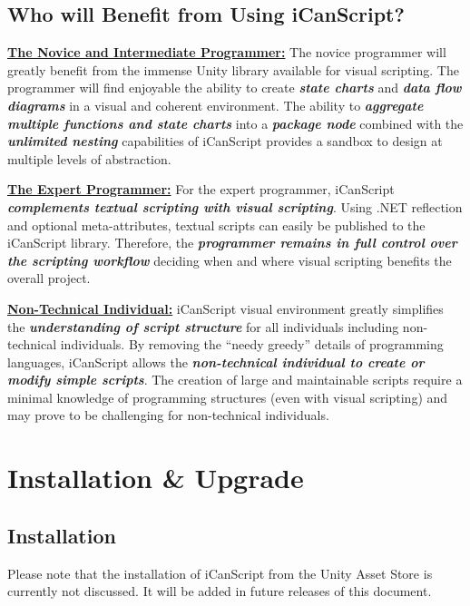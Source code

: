 \chapter{Who will Benefit from Using iCanScript?}
\label{whowillbenefitfromusingicanscript}

\underline{\textbf{The Novice and Intermediate Programmer:}} The novice programmer will greatly benefit from the immense Unity library available for visual scripting. The programmer will find enjoyable the ability to create \emph{\textbf{state charts}} and \emph{\textbf{data flow diagrams}} in a visual and coherent environment. The ability to \emph{\textbf{aggregate multiple functions and state charts}} into a \emph{\textbf{package node}} combined with the \emph{\textbf{unlimited nesting}} capabilities of iCanScript provides a sandbox to design at multiple levels of abstraction.

\underline{\textbf{The Expert Programmer:}} For the expert programmer, iCanScript \emph{\textbf{complements textual scripting with visual scripting}}. Using .NET reflection and optional meta-attributes, textual scripts can easily be published to the iCanScript library. Therefore, the \emph{\textbf{programmer remains in full control over the scripting workflow}} deciding when and where visual scripting benefits the overall project.

\underline{\textbf{Non-Technical Individual:}} iCanScript visual environment greatly simplifies the \emph{\textbf{understanding of script structure}} for all individuals including non-technical individuals. By removing the ``needy greedy'' details of programming languages, iCanScript allows the \emph{\textbf{non-technical individual to create or modify simple scripts}}. The creation of large and maintainable scripts require a minimal knowledge of programming structures (even with visual scripting) and may prove to be challenging for non-technical individuals.

\pagebreak 

\part{Installation \& Upgrade}
\label{installationupgrade}

\chapter{Installation}
\label{installation}
\begin{tipbox}
\color{red}

Please note that the installation of iCanScript from the Unity Asset Store is currently not discussed. It will be added in future releases of this document.

\end{tipbox}



